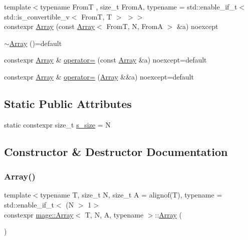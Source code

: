 \begin{DoxyCompactItemize}
\item 
{\footnotesize template$<$typename FromT , size\+\_\+t FromA, typename  = std\+::enable\+\_\+if\+\_\+t$<$ std\+::is\+\_\+convertible\+\_\+v$<$ From\+T, T $>$ $>$$>$ }\\constexpr \mbox{\hyperlink{structmage_1_1_array_a950b26208c3546704f42e92c312a93ed}{Array}} (const \mbox{\hyperlink{structmage_1_1_array}{Array}}$<$ FromT, N, FromA $>$ \&a) noexcept
\item 
\mbox{\hyperlink{structmage_1_1_array_a7adc09166915789b93a7a3af118182e0}{$\sim$\+Array}} ()=default
\item 
constexpr \mbox{\hyperlink{structmage_1_1_array}{Array}} \& \mbox{\hyperlink{structmage_1_1_array_a693f811869bcaae12b5308981682affa}{operator=}} (const \mbox{\hyperlink{structmage_1_1_array}{Array}} \&a) noexcept=default
\item 
constexpr \mbox{\hyperlink{structmage_1_1_array}{Array}} \& \mbox{\hyperlink{structmage_1_1_array_ae90a7beb10b5edc39331e465af0d1acc}{operator=}} (\mbox{\hyperlink{structmage_1_1_array}{Array}} \&\&a) noexcept=default
\end{DoxyCompactItemize}
\subsection*{Static Public Attributes}
\begin{DoxyCompactItemize}
\item 
static constexpr size\+\_\+t \mbox{\hyperlink{structmage_1_1_array_aead6104ec6173aed5755a261b0a82b82}{s\+\_\+size}} = N
\end{DoxyCompactItemize}


\subsection{Constructor \& Destructor Documentation}
\mbox{\label{structmage_1_1_array_ac1cf5733c005dfb79fb9e5e736098598}} 
\subsubsection{\texorpdfstring{Array()}{Array()}\hspace{0.1cm}{\footnotesize\ttfamily [1/10]}}
{\footnotesize\ttfamily template$<$typename T, size\+\_\+t N, size\+\_\+t A = alignof(\+T), typename  = std\+::enable\+\_\+if\+\_\+t$<$ (\+N $>$ 1$>$ \\
constexpr \mbox{\hyperlink{structmage_1_1_array}{mage\+::\+Array}}$<$ T, N, A, typename $>$\+::\mbox{\hyperlink{structmage_1_1_array}{Array}} (\begin{DoxyParamCaption}{ }\end{DoxyParamCaption})\hspace{0.3cm}{\ttfamily [noexcept]}}

